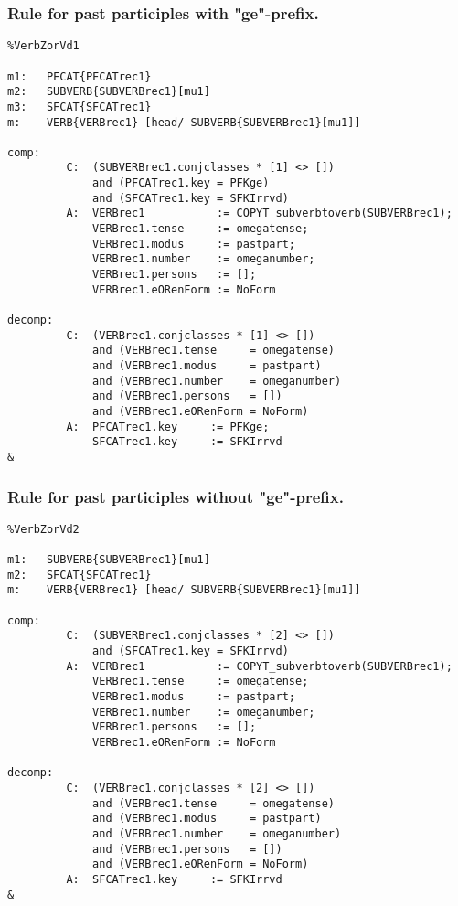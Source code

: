 \subsubsection{Rule for past participles with "ge"-prefix.}
\begin{verbatim}
%VerbZorVd1 

m1:   PFCAT{PFCATrec1}
m2:   SUBVERB{SUBVERBrec1}[mu1]
m3:   SFCAT{SFCATrec1}
m:    VERB{VERBrec1} [head/ SUBVERB{SUBVERBrec1}[mu1]]

comp:
         C:  (SUBVERBrec1.conjclasses * [1] <> [])
             and (PFCATrec1.key = PFKge) 
             and (SFCATrec1.key = SFKIrrvd)
         A:  VERBrec1           := COPYT_subverbtoverb(SUBVERBrec1);
             VERBrec1.tense     := omegatense;
             VERBrec1.modus     := pastpart;
             VERBrec1.number    := omeganumber;
             VERBrec1.persons   := [];
             VERBrec1.eORenForm := NoForm

decomp:
         C:  (VERBrec1.conjclasses * [1] <> [])
             and (VERBrec1.tense     = omegatense) 
             and (VERBrec1.modus     = pastpart)
             and (VERBrec1.number    = omeganumber)
             and (VERBrec1.persons   = [])
             and (VERBrec1.eORenForm = NoForm)
         A:  PFCATrec1.key     := PFKge;
             SFCATrec1.key     := SFKIrrvd
&
\end{verbatim}
\newpage
\subsubsection{Rule for past participles without "ge"-prefix.}
\begin{verbatim}
%VerbZorVd2 

m1:   SUBVERB{SUBVERBrec1}[mu1]
m2:   SFCAT{SFCATrec1}
m:    VERB{VERBrec1} [head/ SUBVERB{SUBVERBrec1}[mu1]]

comp:
         C:  (SUBVERBrec1.conjclasses * [2] <> [])
             and (SFCATrec1.key = SFKIrrvd)
         A:  VERBrec1           := COPYT_subverbtoverb(SUBVERBrec1);
             VERBrec1.tense     := omegatense;
             VERBrec1.modus     := pastpart;
             VERBrec1.number    := omeganumber;
             VERBrec1.persons   := [];
             VERBrec1.eORenForm := NoForm

decomp:
         C:  (VERBrec1.conjclasses * [2] <> [])
             and (VERBrec1.tense     = omegatense) 
             and (VERBrec1.modus     = pastpart)
             and (VERBrec1.number    = omeganumber)
             and (VERBrec1.persons   = [])
             and (VERBrec1.eORenForm = NoForm)
         A:  SFCATrec1.key     := SFKIrrvd
&
\end{verbatim}
\newpage
